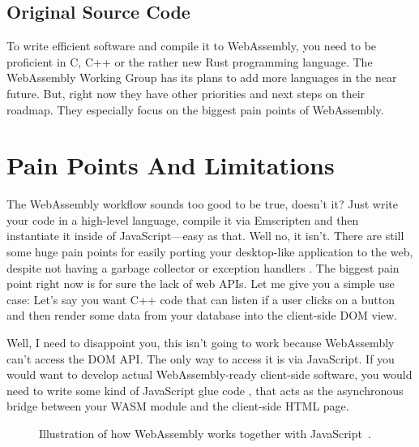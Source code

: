 \documentclass[10pt]{article}  %
\newcommand{\floatcaption}[2]{\caption[#1.]{#1~#2.}}
\begin{document}
\begin{sloppypar}
  \subsection{Original Source Code}
  \label{sec:original-source-code}

  To write efficient software and compile it to WebAssembly, you need to be proficient in C, C++ or the rather new Rust programming language. The WebAssembly Working Group has its plans to add more languages in the near future. But, right now they have other priorities and next steps on their roadmap. They especially focus on the biggest pain points of WebAssembly.

  \section{Pain Points And Limitations}
  \label{sec:pain-points-and-limitations}

  The WebAssembly workflow sounds too good to be true, doesn’t it? Just write your code in a high-level language, compile it via Emscripten and then instantiate it inside of JavaScript—easy as that. Well no, it isn’t. There are still some huge pain points for easily porting your desktop-like application to the web, despite not having a garbage collector or exception handlers \citep{w3c_roadmap_2019}. The biggest pain point right now is for sure the lack of web APIs. Let me give you a simple use case: Let’s say you want C++ code that can listen if a user clicks on a button and then render some data from your database into the client-side DOM view.

  Well, I need to disappoint you, this isn’t going to work because WebAssembly can’t access the DOM API. The only way to access it is via JavaScript. If you would want to develop actual WebAssembly-ready client-side software, you would need to write some kind of JavaScript glue code \citep{mihaylov_how_2018}, that acts as the asynchronous bridge between your WASM module and the client-side HTML page.

  \begin{figure}[ht]
    \centering
    \floatcaption{Illustration of how WebAssembly works together with JavaScript}{\citep{mihaylov_how_2018}}
    \label{fig:glue-code}
  \end{figure}


\end{sloppypar}
\end{document}
